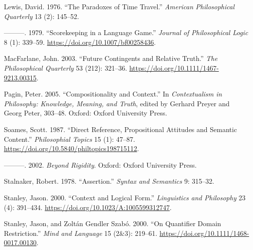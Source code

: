 \documentclass[
  11pt,
  letterpaper,
  DIV=11,
  numbers=noendperiod]{scrartcl}
\newlength{\cslhangindent}
\newenvironment{CSLReferences}[2] %
 {\begin{list}{}{%
  \setlength{\itemindent}{0pt}
  \setlength{\leftmargin}{0pt}
  \setlength{\parsep}{0pt}
  \ifodd #1
   \setlength{\leftmargin}{\cslhangindent}
   \setlength{\itemindent}{-1\cslhangindent}
  \fi
  \setlength{\itemsep}{#2\baselineskip}}}
 {\end{list}}
\begin{document}
\begin{CSLReferences}{1}{0}
Lewis, David. 1976. {``The Paradoxes of Time Travel.''} \emph{American
Philosophical Quarterly} 13 (2): 145--52.

---------. 1979. {``Scorekeeping in a Language Game.''} \emph{Journal of
Philosophical Logic} 8 (1): 339--59.
\url{https://doi.org/10.1007/bf00258436}.

MacFarlane, John. 2003. {``{Future Contingents and Relative Truth}.''}
\emph{The Philosophical Quarterly} 53 (212): 321--36.
\url{https://doi.org/10.1111/1467-9213.00315}.

Pagin, Peter. 2005. {``Compositionality and Context.''} In
\emph{Contextualism in Philosophy: Knowledge, Meaning, and Truth},
edited by Gerhard Preyer and Georg Peter, 303--48. Oxford: Oxford
University Press.

Soames, Scott. 1987. {``Direct Reference, Propositional Attitudes and
Semantic Content.''} \emph{Philosophial Topics} 15 (1): 47--87.
\url{https://doi.org/10.5840/philtopics198715112}.

---------. 2002. \emph{Beyond Rigidity}. Oxford: Oxford University
Press.

Stalnaker, Robert. 1978. {``Assertion.''} \emph{Syntax and Semantics} 9:
315--32.

Stanley, Jason. 2000. {``{Context and Logical Form}.''}
\emph{Linguistics and Philosophy} 23 (4): 391--434.
\url{https://doi.org/10.1023/A:1005599312747}.

Stanley, Jason, and Zoltán Gendler Szabó. 2000. {``{On Quantifier Domain
Restriction}.''} \emph{Mind and Language} 15 (2\&3): 219--61.
\url{https://doi.org/10.1111/1468-0017.00130}.

\end{CSLReferences}
\end{document}
